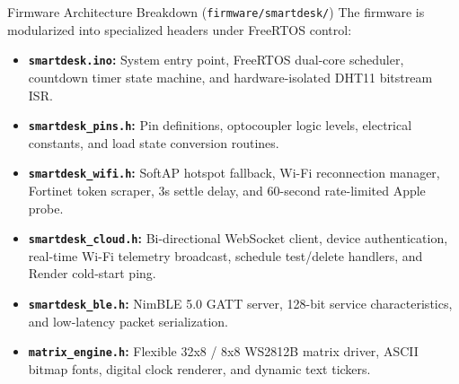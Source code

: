 \documentclass[aspectratio=169, 10pt]{beamer}
\begin{document}
\begin{frame}{Firmware Architecture Breakdown (\texttt{firmware/smartdesk/})}
    The firmware is modularized into specialized headers under FreeRTOS control:
    \vspace{0.2cm}
    \begin{itemize}
        \item \textbf{\texttt{smartdesk.ino}:} System entry point, FreeRTOS dual-core scheduler, countdown timer state machine, and hardware-isolated DHT11 bitstream ISR.
        \item \textbf{\texttt{smartdesk\_pins.h}:} Pin definitions, optocoupler logic levels, electrical constants, and load state conversion routines.
        \item \textbf{\texttt{smartdesk\_wifi.h}:} SoftAP hotspot fallback, Wi-Fi reconnection manager, Fortinet token scraper, 3s settle delay, and 60-second rate-limited Apple probe.
        \item \textbf{\texttt{smartdesk\_cloud.h}:} Bi-directional WebSocket client, device authentication, real-time Wi-Fi telemetry broadcast, schedule test/delete handlers, and Render cold-start ping.
        \item \textbf{\texttt{smartdesk\_ble.h}:} NimBLE 5.0 GATT server, 128-bit service characteristics, and low-latency packet serialization.
        \item \textbf{\texttt{matrix\_engine.h}:} Flexible 32x8 / 8x8 WS2812B matrix driver, ASCII bitmap fonts, digital clock renderer, and dynamic text tickers.
    \end{itemize}
\end{frame}
\end{document}
